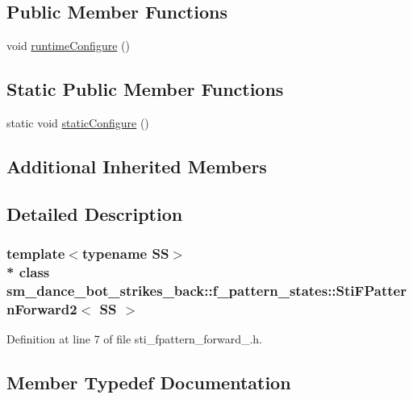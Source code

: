 \subsection*{Public Member Functions}
\begin{DoxyCompactItemize}
\item 
void \hyperlink{structsm__dance__bot__strikes__back_1_1f__pattern__states_1_1StiFPatternForward2_a309ed80f56e45f62ec62e5df4bda5221}{runtime\+Configure} ()
\end{DoxyCompactItemize}
\subsection*{Static Public Member Functions}
\begin{DoxyCompactItemize}
\item 
static void \hyperlink{structsm__dance__bot__strikes__back_1_1f__pattern__states_1_1StiFPatternForward2_aef6a4bfb3bd8cdb9eb697a0a03034171}{static\+Configure} ()
\end{DoxyCompactItemize}
\subsection*{Additional Inherited Members}


\subsection{Detailed Description}
\subsubsection*{template$<$typename SS$>$\\*
class sm\+\_\+dance\+\_\+bot\+\_\+strikes\+\_\+back\+::f\+\_\+pattern\+\_\+states\+::\+Sti\+F\+Pattern\+Forward2$<$ S\+S $>$}



Definition at line 7 of file sti\+\_\+fpattern\+\_\+forward\+\_.\+h.



\subsection{Member Typedef Documentation}
